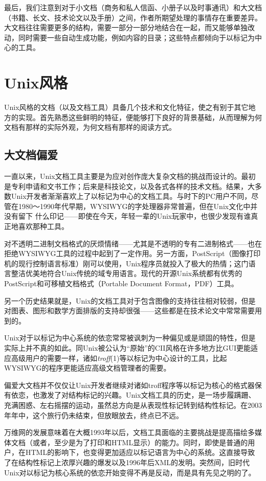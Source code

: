 \documentclass[12pt,oneside]{book}
\begin{document}
最后，我们注意到对于小文档（商务和私人信函、小册子以及时事通讯）和大文档（书籍、长文、技术论文以及手册）之间，作者所期望处理的事情存在重要差异。大文档往往需要更多的结构，需要一部分一部分地结合在一起，而又能够单独改动，同时需要一些自动生成功能，例如内容的目录；这些特点都倾向于以标记为中心的工具。

\section{Unix风格}
Unix风格的文档（以及文档工具）具备几个技术和文化特征，使之有别于其它地方的实现。首先熟悉这些鲜明的特征，便能够打下良好的背景基础，从而理解为何文档有那样的实际外观，为何文档有那样的阅读方式。

\subsection{大文档偏爱}
一直以来，Unix文档工具主要是为应对创作庞大复杂文档的挑战而设计的。最初是专利申请和文书工作；后来是科技论文，以及各式各样的技术文档。结果，大多数Unix开发者渐渐喜欢上了以标记为中心的文档工具。与时下的PC用户不同，尽管在1980～1990年代早期，WYSIWYG的字处理器非常普遍，但在Unix文化中并没有留下
什么印记——即使在今天，年轻一辈的Unix玩家中，也很少发现有谁真正地喜欢那种工具。

对不透明二进制文档格式的厌烦情绪——尤其是不透明的专有二进制格式——也在拒绝WYSIWYG工具的过程中起到了一定作用。另一方面，PostScript（图像打印机的现行控制语言标准）刚可以使用，Unix程序员就投入了极大的热情；这门语言整洁优美地符合Unix传统的域专用语言。现代的开源Unix系统都有优秀的PostScript和可移植文档格式（Portable Document Format，PDF）工具。

另一个历史结果就是，Unix的文档工具对于包含图像的支持往往相对较弱，但是对图表、图形和数学方面排版的支持却很强——这些都是在技术论文中常常需要用到的。

Unix对于以标记为中心系统的依恋常常被讽刺为一种偏见或是顽固的特性，但是实际上并不真的如此。同Unix被公认为“原始”的CII风格在许多地方比GUI更能适应高级用户的需要一样，诸如\textit{troff}(1)等以标记为中心设计的工具，比起WYSIWYG的程序更能适应高级文档管理者的需要。

偏爱大文档并不仅仅让Unix开发者继续对诸如troff程序等以标记为核心的格式器保有依恋，也激发了对结构标记的兴趣。Unix文档工具的历史，是一场步履蹒跚、充满困惑、左右摇摆的运动，虽然总方向是从表现性标记转到结构性标记。在2003年年中，这个旅行仍未结束，但放眼放去，终点已不远。

万维网的发展意味着在大概1993年以后，文档工具面临的主要挑战是提高描绘多媒体文档（或者，至少是为了打印和HTML显示）的能力。同时，即使是普通的用户，在HTML的影响下，也变得更加适应以标记语言为中心的系统。这直接导致了在结构性标记上浓厚兴趣的爆发以及1996年后XML的发明。突然间，旧时代Unix对以标记为核心系统的依恋开始变得不再是反动，而是具有先见之明的了。
\end{document}
